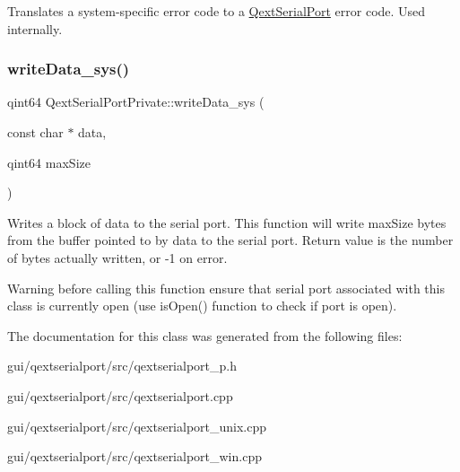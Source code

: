 Translates a system-\/specific error code to a \hyperlink{classQextSerialPort}{Qext\+Serial\+Port} error code. Used internally. \mbox{\label{classQextSerialPortPrivate_a54ad0646018e3a519582c81fd3631cc2}} 
\subsubsection{\texorpdfstring{write\+Data\+\_\+sys()}{writeData\_sys()}}
{\footnotesize\ttfamily qint64 Qext\+Serial\+Port\+Private\+::write\+Data\+\_\+sys (\begin{DoxyParamCaption}\item[{const char $\ast$}]{data,  }\item[{qint64}]{max\+Size }\end{DoxyParamCaption})}

Writes a block of data to the serial port. This function will write max\+Size bytes from the buffer pointed to by data to the serial port. Return value is the number of bytes actually written, or -\/1 on error.

\begin{DoxyWarning}{Warning}
before calling this function ensure that serial port associated with this class is currently open (use is\+Open() function to check if port is open). 
\end{DoxyWarning}


The documentation for this class was generated from the following files\+:\begin{DoxyCompactItemize}
\item 
gui/qextserialport/src/qextserialport\+\_\+p.\+h\item 
gui/qextserialport/src/qextserialport.\+cpp\item 
gui/qextserialport/src/qextserialport\+\_\+unix.\+cpp\item 
gui/qextserialport/src/qextserialport\+\_\+win.\+cpp\end{DoxyCompactItemize}
